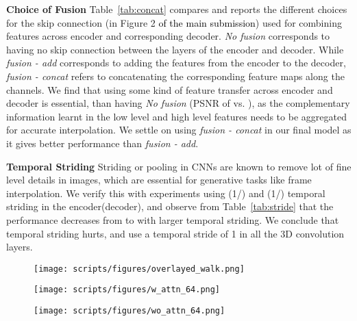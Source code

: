 \documentclass[10pt,twocolumn,letterpaper]{article}
\newcommand{\tabref}[1]{Table~\ref{#1}}
\newcommand{\twox}{}
\newcommand{\fourx}{}
\begin{document}
\begin{table*}[!t]
{\bf Choice of Fusion} \tabref{tab:concat} compares and reports the different choices for the skip connection (in Figure 2 \textcolor{black}{of the main submission}) used for combining features across encoder and corresponding decoder. \textit{No fusion } corresponds to having no skip connection between the layers of the encoder and decoder. While \textit{fusion - add } corresponds to adding the features from the encoder to the decoder, \textit{fusion - concat} refers to concatenating the corresponding feature maps along the channels. We find that using some kind of feature transfer across encoder and decoder is essential, than having \textit{No fusion } (PSNR of  vs. ), as the complementary information learnt in the low level and high level features needs to be aggregated for accurate interpolation. We settle on using \textit{fusion - concat} in our final model as it gives better performance than \textit{fusion - add}. 

{\bf Temporal Striding} Striding or pooling in CNNs are known to remove lot of fine level details in images, which are essential for generative tasks like frame interpolation. We verify this with experiments using \twox{}(1/\twox{}) and \fourx{}(1/\fourx{}) temporal striding in the encoder(decoder), and observe from \tabref{tab:stride} that the performance decreases from  to  with larger temporal striding. We conclude that temporal striding hurts, and use a temporal stride of 1 in all the 3D convolution layers.

\begin{figure*}
     \centering


     \begin{subfigure}[t]{0.28\textwidth}
         \centering
         \texttt{[image: scripts/figures/overlayed\_walk.png]}
         \label{fig:overlay}
     \end{subfigure}
\begin{subfigure}[t]{0.28\textwidth}
         \centering
         \texttt{[image: scripts/figures/w\_attn\_64.png]}
         \label{fig:withAttn}
     \end{subfigure}
\begin{subfigure}[t]{0.28\textwidth}
         \centering
         \texttt{[image: scripts/figures/wo\_attn\_64.png]}
         \captionsetup{width=\textwidth}
         \label{fig:withoutAttn}
     \end{subfigure}
    \caption{{\bf Visualization of attention weighted feature maps} (a) The overlayed input frames. (b) The feature map of the channel with the highest attention weight in the network with feature gating. (c)  The same feature map without using the gating module. We observe higher activation (red) in (b) along the motion boundaries. Best viewed in color.
    }
    \label{fig:attnMaps}
\end{figure*}



\end{table*}
\end{document}

